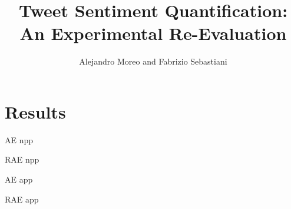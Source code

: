 \documentclass[10pt,a4paper]{article}
\title{Tweet Sentiment Quantification: \\ An Experimental
Re-Evaluation}
\author{Alejandro Moreo and Fabrizio Sebastiani}
\begin{document}
\flushbottom
\thispagestyle{empty}




\section{Results}
\label{sec:results}



\begin{table}[h]
\tiny

    \caption{AE npp}
    \begin{center}
    \resizebox{\textwidth}{!}{%
        
    }
  \end{center}
  \label{tab:npp:ae}
\end{table}

\begin{table}[h]
\tiny

    \caption{RAE npp}
    \begin{center}
    \resizebox{\textwidth}{!}{%
        
    }
  \end{center}
  \label{tab:npp:rae}
\end{table}

\begin{table}[h]
\tiny

    \caption{AE app}
    \begin{center}
    \resizebox{\textwidth}{!}{%
        
    }
  \end{center}
  \label{tab:app:ae}
\end{table}

\begin{table}[h]
\tiny

    \caption{RAE app}
    \begin{center}
    \resizebox{\textwidth}{!}{%
        
    }
  \end{center}
  \label{tab:app:rae}
\end{table}
    
%
\end{document}
